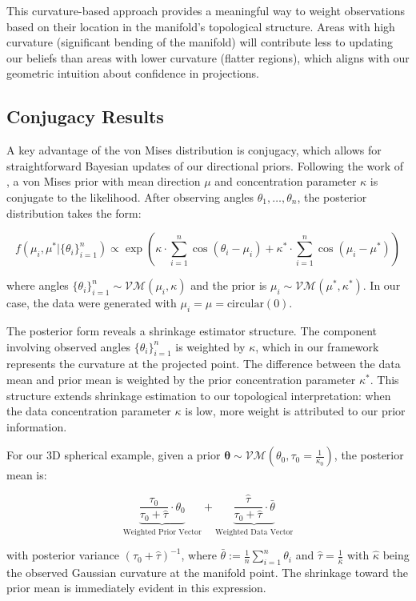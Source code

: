 \documentclass[twoside,11pt]{article}
\begin{document}
This curvature-based approach provides a meaningful way to weight observations based on their location in the manifold's topological structure. Areas with high curvature (significant bending of the manifold) will contribute less to updating our beliefs than areas with lower curvature (flatter regions), which aligns with our geometric intuition about confidence in projections.

\subsection{Conjugacy Results}\label{sc:conjugacy}

A key advantage of the von Mises distribution is conjugacy, which allows for straightforward Bayesian updates of our directional priors. Following the work of \citet{mardia1976}, a von Mises prior with mean direction $\mu$ and concentration parameter $\kappa$ is conjugate to the likelihood. After observing angles $\theta_1,\ldots,\theta_n$, the posterior distribution takes the form:

$$
f(\mu_i, \mu^* | \{\theta_i\}_{i=1}^n) \propto \exp(\kappa \cdot \sum_{i=1}^n \cos(\theta_i - \mu_i) +\kappa^* \cdot \sum_{i=1}^n \cos(\mu_i - \mu^*))
$$

where angles $\{\theta_i\}_{i=1}^n \sim \mathcal{VM}(\mu_i, \kappa)$ and the prior is $\mu_i \sim \mathcal{VM}(\mu^*, \kappa^*)$. In our case, the data were generated with $\mu_i = \mu = \text{circular}(0)$.

The posterior form reveals a shrinkage estimator structure. The component involving observed angles $\{\theta_i\}_{i=1}^n$ is weighted by $\kappa$, which in our framework represents the curvature at the projected point. The difference between the data mean and prior mean is weighted by the prior concentration parameter $\kappa^*$. This structure extends shrinkage estimation to our topological interpretation: when the data concentration parameter $\kappa$ is low, more weight is attributed to our prior information.

For our 3D spherical example, given a prior $\boldsymbol{\theta} \sim \mathcal{VM}(\theta_0, \tau_0 = \frac{1}{\kappa_0})$, the posterior mean is:

$$
\underbrace{\frac{\tau_0}{\tau_0 + \hat{\tau}} \cdot \theta_0}_{\text{Weighted Prior Vector}} + \underbrace{\frac{\hat{\tau}}{\tau_0 + \hat{\tau}} \cdot \bar{\theta}}_{\text{Weighted Data Vector}}
$$

with posterior variance $(\tau_0 + \hat{\tau})^{-1}$, where $\bar{\theta} := \frac{1}{n}\sum_{i=1}^n \theta_i$ and $\hat{\tau} = \frac{1}{\hat{\kappa}}$ with $\hat{\kappa}$ being the observed Gaussian curvature at the manifold point. The shrinkage toward the prior mean is immediately evident in this expression.
\end{document}

